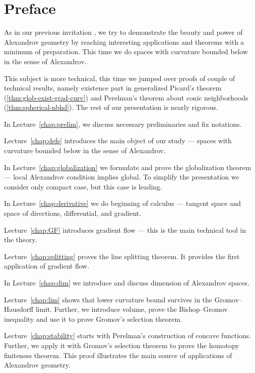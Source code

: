 \chapter*{Preface}

As in our previous invitation \cite{alexander-kapovitch-petrunin-2019},
we try to demonstrate the beauty and power of Alexandrov geometry by reaching interesting applications and theorems with a minimum of preparation.
This time we do spaces with curvature bounded below in the sense of Alexandrov.

This subject is more technical, this time we jumped over proofs of couple of technical results,
namely existence part in generalized Picard's theorem (\ref{thm:glob-exist-grad-curv})
and Perelman's theorem about conic neighborhoods (\ref{thm:spherical-nbhd}).
The rest of our presentation is nearly rigorous.

\medskip 

In Lecture~\ref{chap:prelim}, we discuss necessary preliminaries and fix notations.

Lecture~\ref{chap:defs} introduces the main object of our study --- spaces with curvature bounded below in the sense of Alexandrov.

In Lecture~\ref{chap:globalization} we formulate and prove the globalization theorem --- local Alexandrov condition implies global.
To simplify the presentation we consider only compact case, but this case is leading.

In Lecture~\ref{chap:derivative} we do beginning of calculus --- tangent space and space of directions, differential, and gradient.

Lecture~\ref{chap:GF} introduces gradient flow --- this is the main technical tool in the theory.

Lecture~\ref{chap:splitting} proves the line splitting theorem.
It provides the first application of gradient flow.

In Lecture~\ref{chap:dim} we introduce and discuss dimension of Alexandrov spaces.

Lecture~\ref{chap:lim} shows that lower curvature bound survives in the Gromov--Hausdorff limit.
Further, we introduce volume, prove the Bishop--Gromov inequality and use it to prove Gromov's selection theorem.

Lecture~\ref{chap:stability} starts with Perelman's construction of concave functions.
Further, we apply it with Gromov's selection theorem to prove the homotopy finiteness theorem.
This proof illustrates the main source of applications of Alexandrov geometry.

